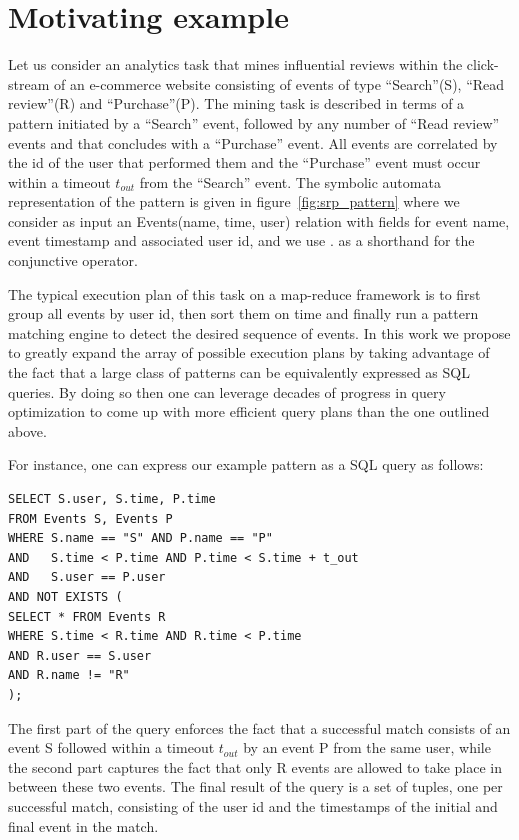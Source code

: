 
\section{Motivating example}
\label{sec:mot_example}

Let us consider an analytics task that mines influential reviews
within the click-stream of an e-commerce website consisting of events of type
``Search''(S), ``Read review''(R) and ``Purchase''(P).
The mining task is described in terms of a pattern initiated by a ``Search''
event, followed by any number of ``Read review'' events and that concludes with
a ``Purchase'' event. 
All events are correlated by the id of the user that performed them and the
``Purchase'' event must occur within a timeout $t_{out}$ from the ``Search'' 
event. 
The symbolic automata representation of the pattern is given in
figure~\ref{fig:srp_pattern} where we consider as input an Events(name, time,
user) relation with fields for event name, event timestamp and
associated user id, and we use $.$ as a shorthand for the conjunctive operator.

The typical execution plan of this task on a map-reduce framework is to first
group all events by user id, then sort them on time and finally run a pattern
matching engine to detect the desired sequence of events.
In this work we propose to greatly expand the array of possible execution plans
by taking advantage of the fact that a large class of patterns can be
equivalently expressed as SQL queries.
By doing so then one can leverage decades of progress in query optimization to
come up with more efficient query plans than the one outlined above.

For instance, one can express our example pattern as a SQL query as follows:
\begin{verbatim}
SELECT S.user, S.time, P.time
FROM Events S, Events P
WHERE S.name == "S" AND P.name == "P"  
AND   S.time < P.time AND P.time < S.time + t_out
AND   S.user == P.user
AND NOT EXISTS ( 
SELECT * FROM Events R
WHERE S.time < R.time AND R.time < P.time
AND R.user == S.user
AND R.name != "R"
); 
\end{verbatim}

The first part of the query enforces the fact that a successful match consists
of an event S followed within a timeout $t_{out}$ by an event P from the same 
user,
while the second part captures the fact that only R events are allowed to take
place in between these two events.
The final result of the query is a set of tuples, one per successful match,
consisting of the user id and the timestamps of the initial and final event
in the match.

